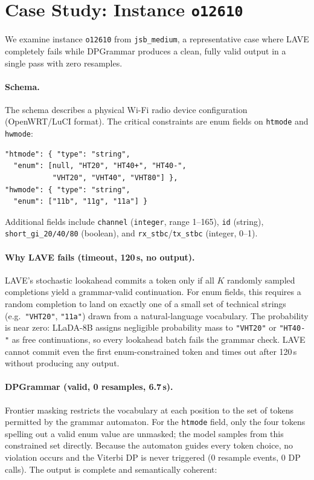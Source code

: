 \section{Case Study: Instance \texttt{o12610}}
\label{app:case}

We examine instance \texttt{o12610} from \texttt{jsb\_medium}, a representative case where LAVE completely fails while DPGrammar produces a clean, fully valid output in a single pass with zero resamples.

\paragraph{Schema.}
The schema describes a physical Wi-Fi radio device configuration (OpenWRT/LuCI format).
The critical constraints are enum fields on \texttt{htmode} and \texttt{hwmode}:

\begin{lstlisting}[style=appendixcode]
"htmode": { "type": "string",
  "enum": [null, "HT20", "HT40+", "HT40-",
           "VHT20", "VHT40", "VHT80"] },
"hwmode": { "type": "string",
  "enum": ["11b", "11g", "11a"] }
\end{lstlisting}

Additional fields include \texttt{channel} (\texttt{integer}, range 1--165), \texttt{id} (string), \texttt{short\_gi\_20/40/80} (boolean), and \texttt{rx\_stbc}/\texttt{tx\_stbc} (integer, 0--1).

\paragraph{Why LAVE fails (timeout, 120\,s, no output).}
LAVE's stochastic lookahead commits a token only if all $K$ randomly sampled completions yield a grammar-valid continuation.
For enum fields, this requires a random completion to land on exactly one of a small set of technical strings (e.g.\ \texttt{"VHT20"}, \texttt{"11a"}) drawn from a natural-language vocabulary.
The probability is near zero: LLaDA-8B assigns negligible probability mass to \texttt{"VHT20"} or \texttt{"HT40-"} as free continuations, so every lookahead batch fails the grammar check.
LAVE cannot commit even the first enum-constrained token and times out after 120\,s without producing any output.

\paragraph{DPGrammar (valid, 0 resamples, 6.7\,s).}
Frontier masking restricts the vocabulary at each position to the set of tokens permitted by the grammar automaton.
For the \texttt{htmode} field, only the four tokens spelling out a valid enum value are unmasked; the model samples from this constrained set directly.
Because the automaton guides every token choice, no violation occurs and the Viterbi DP is never triggered (0 resample events, 0 DP calls).
The output is complete and semantically coherent:

